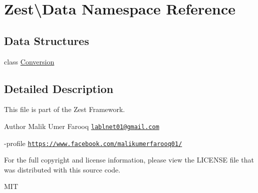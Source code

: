 \hypertarget{namespace_zest_1_1_data}{}\section{Zest\textbackslash{}Data Namespace Reference}
\label{namespace_zest_1_1_data}
\subsection*{Data Structures}
\begin{DoxyCompactItemize}
\item 
class \mbox{\hyperlink{class_zest_1_1_data_1_1_conversion}{Conversion}}
\end{DoxyCompactItemize}


\subsection{Detailed Description}
This file is part of the Zest Framework.

\begin{DoxyAuthor}{Author}
Malik Umer Farooq \href{mailto:lablnet01@gmail.com}{\tt lablnet01@gmail.\+com} 

-\/profile \href{https://www.facebook.com/malikumerfarooq01/}{\tt https\+://www.\+facebook.\+com/malikumerfarooq01/}
\end{DoxyAuthor}
For the full copyright and license information, please view the L\+I\+C\+E\+N\+SE file that was distributed with this source code.

M\+IT 